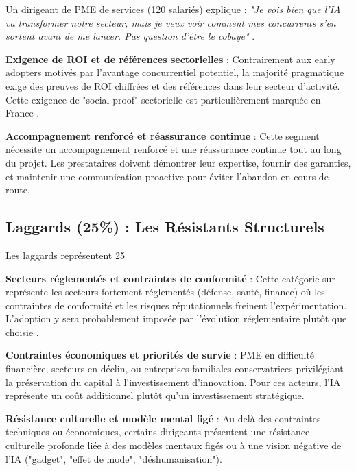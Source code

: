 Un dirigeant de PME de services (120 salariés) explique : \emph{"Je vois bien que l'IA va transformer notre secteur, mais je veux voir comment mes concurrents s'en sortent avant de me lancer. Pas question d'être le cobaye"} \cite{luwai2025meetings}.

\textbf{Exigence de ROI et de références sectorielles} : Contrairement aux early adopters motivés par l'avantage concurrentiel potentiel, la majorité pragmatique exige des preuves de ROI chiffrées et des références dans leur secteur d'activité. Cette exigence de "social proof" sectorielle est particulièrement marquée en France \cite{hofstede2001culture}.

\textbf{Accompagnement renforcé et réassurance continue} : Cette segment nécessite un accompagnement renforcé et une réassurance continue tout au long du projet. Les prestataires doivent démontrer leur expertise, fournir des garanties, et maintenir une communication proactive pour éviter l'abandon en cours de route.

\subsection{Laggards (25\%) : Les Résistants Structurels}

Les laggards représentent 25%

\textbf{Secteurs réglementés et contraintes de conformité} : Cette catégorie sur-représente les secteurs fortement réglementés (défense, santé, finance) où les contraintes de conformité et les risques réputationnels freinent l'expérimentation. L'adoption y sera probablement imposée par l'évolution réglementaire plutôt que choisie \cite{bertolucci2024artificial}.

\textbf{Contraintes économiques et priorités de survie} : PME en difficulté financière, secteurs en déclin, ou entreprises familiales conservatrices privilégiant la préservation du capital à l'investissement d'innovation. Pour ces acteurs, l'IA représente un coût additionnel plutôt qu'un investissement stratégique.

\textbf{Résistance culturelle et modèle mental figé} : Au-delà des contraintes techniques ou économiques, certains dirigeants présentent une résistance culturelle profonde liée à des modèles mentaux figés ou à une vision négative de l'IA ("gadget", "effet de mode", "déshumanisation").

